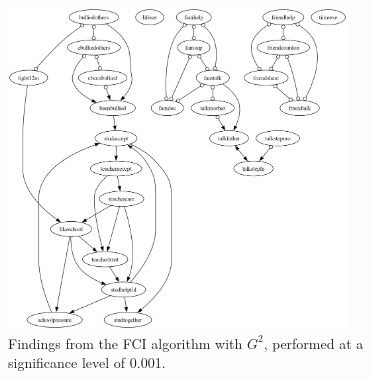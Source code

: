 \begin{figure}[htbp]
    \centering
    \includegraphics[width=0.8\textwidth]{Report/final_report/pictures/FCI_gsq_0.001_all_UA_27_talkmother.png}
    \caption{Findings from the FCI algorithm with $G^2$, performed at a significance level of 0.001.}
    \label{fig:fci_gsq_0.001all_UA_27_talkmother}
\end{figure}
